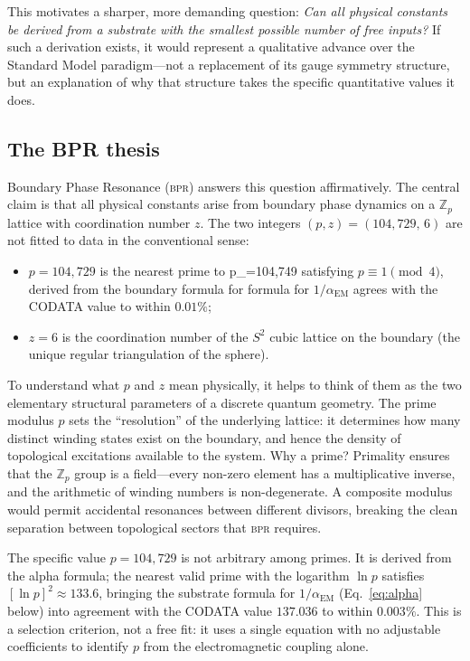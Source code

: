 \documentclass[aps,prd,twocolumn,superscriptaddress,longbibliography,nofootinbib]{revtex4-2}
\newcommand{\Zp}{\mathbb{Z}_p}
\newcommand{\Stwo}{S^2}
\newcommand{\alphaEM}{\alpha_{\mathrm{EM}}}
\newcommand{\bpr}{\textsc{bpr}}
\begin{document}
This motivates a sharper, more demanding question: \textit{Can all
physical constants be derived from a substrate with the smallest
possible number of free inputs?}  If such a derivation exists, it
would represent a qualitative advance over the Standard Model
paradigm---not a replacement of its gauge symmetry structure, but an
explanation of why that structure takes the specific quantitative
values it does.

\subsection{The BPR thesis}

Boundary Phase Resonance (\bpr) answers this question affirmatively.
The central claim is that all physical constants arise from boundary
phase dynamics on a $\Zp$ lattice with coordination number $z$.
The two integers $(p, z) = (104{,}729,\, 6)$ are not fitted to
data in the conventional sense:
\begin{itemize}
\item $p = 104{,}729$ is the nearest prime to p_=104{,}749 satisfying $p\equiv 1\pmod{4}$, derived from the boundary formula for
  formula for $1/\alphaEM$ agrees with the CODATA value to within
  $0.01\%$;
\item $z = 6$ is the coordination number of the $\Stwo$ cubic
  lattice on the boundary (the unique regular triangulation of the
  sphere).
\end{itemize}

To understand what $p$ and $z$ mean physically, it helps to think of
them as the two elementary structural parameters of a discrete
quantum geometry.  The prime modulus $p$ sets the ``resolution'' of
the underlying lattice: it determines how many distinct winding
states exist on the boundary, and hence the density of topological
excitations available to the system.  Why a prime?  Primality ensures
that the $\Zp$ group is a field---every non-zero element has a
multiplicative inverse, and the arithmetic of winding numbers is
non-degenerate.  A composite modulus would permit accidental
resonances between different divisors, breaking the clean separation
between topological sectors that \bpr{} requires.

The specific value $p = 104{,}729$ is not arbitrary among primes.  It
is derived from the alpha formula; the nearest valid prime with the logarithm $\ln p$ satisfies
$[\ln p]^2 \approx 133.6$, bringing the substrate formula for
$1/\alphaEM$ (Eq.~\eqref{eq:alpha} below) into agreement with the
CODATA value $137.036$ to within $0.003\%$.  This is a selection
criterion, not a free fit: it uses a single equation with no adjustable
coefficients to identify $p$ from the electromagnetic coupling alone.
\end{document}

